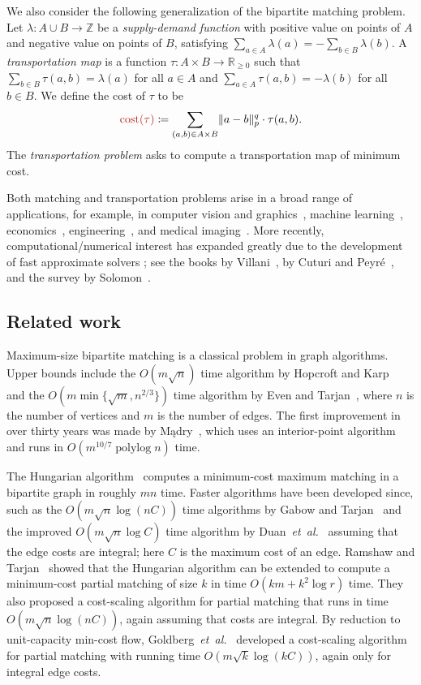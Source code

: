 \documentclass[a4paper,UKenglish]{socg-lipics-v2018}
\def\etal{\emph{et~al.}}
\def\etal{\textit{et~al.}}
\def\polylog{\mathop{\mathrm{polylog}}}
\def\reals{\mathbb{R}}
\def\ints{\mathbb{Z}}
\def\abs#1{\mathopen| #1 \mathclose|}		%
\def\norm#1{\mathopen\| #1 \mathclose\|}	%
\def\tsupply{\lambda}
\def\cost{\operatorname{cost}}
\theoremstyle{plain}
\numberwithin{figure}{section}
\def\EMPH#1{\textcolor{BrickRed}{{\emph{#1}}}}
\begin{document}
We also consider the following generalization of the bipartite matching problem.
Let $\tsupply:A \cup B \to \ints$ be a \EMPH{supply-demand function} with
positive value on points of $A$ and negative value on points of $B$, satisfying
$\sum_{a \in A} \tsupply(a) = - \sum_{b \in B} \tsupply(b)$.
A \EMPH{transportation map} is a function $\tau: A \times B \to \reals_{\geq 0}$
such that $\sum_{b \in B} \tau(a, b) = \tsupply(a)$ for all $a \in A$ and
$\sum_{a \in A} \tau(a, b) = -\tsupply(b)$ for all $b \in B$.
We define the cost of $\tau$ to be
\begin{equation*}
	\EMPH{$\cost(\tau)$} \coloneqq \sum_{(a, b) \in A \times B} \norm{a-b}_p^q \cdot \tau(a, b).
\end{equation*}
The \EMPH{transportation problem} asks to compute a transportation map of minimum cost.

Both matching and transportation problems arise in a broad range of applications,
for example, in
computer vision and graphics~\cite{RTG98,SGPCBNDG15,P15},
machine learning~\cite{BBR06,ACB17},
economics~\cite{G16},
engineering~\cite{O87,STTP14},
and medical imaging~\cite{GPC15}.
More recently, computational/numerical interest has expanded greatly due to
the development of fast approximate solvers \cite{C13,AWR17,DGK18,ABRW18};
see the books by Villani~\cite{V03,V08}, by Cuturi and Peyr{\'e}~\cite{PC18},
and the survey by Solomon~\cite{S18}.

\subsection{Related work}

Maximum-size bipartite matching is a classical problem in graph algorithms.
Upper bounds include the $O(m\sqrt{n})$ time algorithm by
Hopcroft and Karp~\cite{HK73} and the $O(m \min\{\sqrt{m}, n^{2/3}\})$ time
algorithm by Even and Tarjan~\cite{ET75}, where $n$ is the
number of vertices and $m$ is the number of edges.
The first improvement in over thirty years was made by M{\k a}dry~\cite{M13},
which uses an interior-point algorithm and runs in $O(m^{10/7}\polylog n)$ time.

The Hungarian algorithm~\cite{Kuhn55} computes a minimum-cost maximum matching
in a bipartite graph in roughly $mn$ time.
Faster algorithms have been developed since,
such as the $O(m\sqrt{n}\log(nC))$ time algorithms by Gabow and
Tarjan~\cite{GT89} and the improved $O(m\sqrt{n}\log C)$ time algorithm by
Duan~\etal~\cite{DPS11} assuming that the edge costs are integral;
here $C$ is the maximum cost of an edge.
Ramshaw and Tarjan~\cite{RT12} showed that the Hungarian algorithm can be extended to compute a minimum-cost partial
matching of size $k$ in time $O(km + k^2\log r)$ time.
They also proposed a cost-scaling algorithm for partial
matching that runs in time $O(m\sqrt{n}\log(nC))$, again assuming that costs
are integral.
By reduction to unit-capacity min-cost flow, Goldberg~\etal~\cite{GHKT17}
developed a cost-scaling algorithm for partial matching with running time
$O(m\sqrt{k}\log(kC))$,
again only for integral edge costs.
\end{document}
